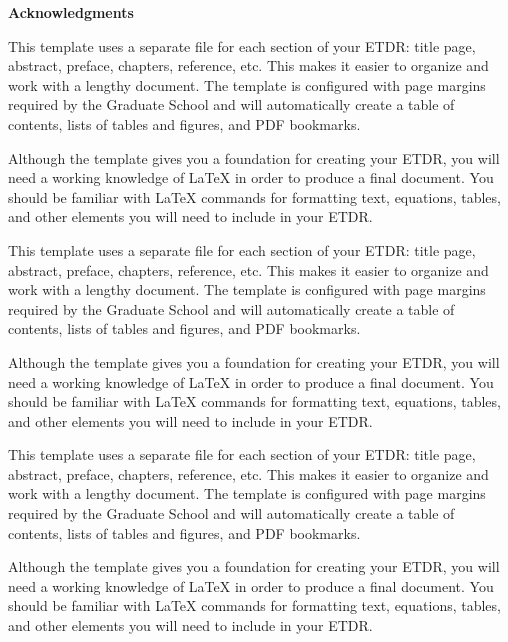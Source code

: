 
\newpage
\vspace*{0.9cm}
\begin{center}
{\bf \Huge Acknowledgments}
\end{center}

\setlength{\baselineskip}{0.8cm}



This template uses a separate file for each section of your ETDR:
title page, abstract, preface, chapters, reference, etc.  This
makes it easier to organize and work with a lengthy document.  The
template is configured with page margins required by the Graduate
School and will automatically create a table of contents, lists of
tables and figures, and PDF bookmarks.

Although the template gives you a foundation for creating your
ETDR, you will need a working knowledge of LaTeX in order to
produce a final document.  You should be familiar with LaTeX
commands for formatting text, equations, tables, and other
elements you will need to include in your ETDR.

This template uses a separate file for each section of your ETDR:
title page, abstract, preface, chapters, reference, etc.  This
makes it easier to organize and work with a lengthy document.  The
template is configured with page margins required by the Graduate
School and will automatically create a table of contents, lists of
tables and figures, and PDF bookmarks.

Although the template gives you a foundation for creating your
ETDR, you will need a working knowledge of LaTeX in order to
produce a final document.  You should be familiar with LaTeX
commands for formatting text, equations, tables, and other
elements you will need to include in your ETDR.

This template uses a separate file for each section of your ETDR:
title page, abstract, preface, chapters, reference, etc.  This
makes it easier to organize and work with a lengthy document.  The
template is configured with page margins required by the Graduate
School and will automatically create a table of contents, lists of
tables and figures, and PDF bookmarks.

Although the template gives you a foundation for creating your
ETDR, you will need a working knowledge of LaTeX in order to
produce a final document.  You should be familiar with LaTeX
commands for formatting text, equations, tables, and other
elements you will need to include in your ETDR.
